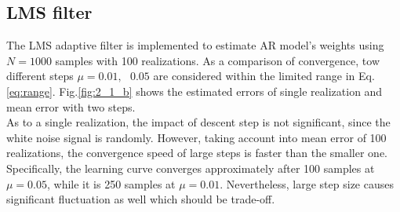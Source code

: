 \subsection{LMS filter}
The LMS adaptive filter is implemented to estimate AR model's weights using $N=1000$ samples with 100 realizations. As a comparison of convergence, tow different steps $\mu=0.01,\text{ }0.05$ are considered within the limited range in Eq.\ref{eq:range}. Fig.\ref{fig:2_1_b} shows the estimated errors of single realization and mean error with two steps.\\
As to a single realization, the impact of descent step is not significant, since the white noise signal is randomly. However, taking account into mean error of 100 realizations, the convergence speed of large steps is faster than the smaller one. Specifically, the learning curve converges approximately after 100 samples at $\mu=0.05$, while it is 250 samples at $\mu=0.01$. Nevertheless, large step size causes significant fluctuation as well which should be trade-off.
